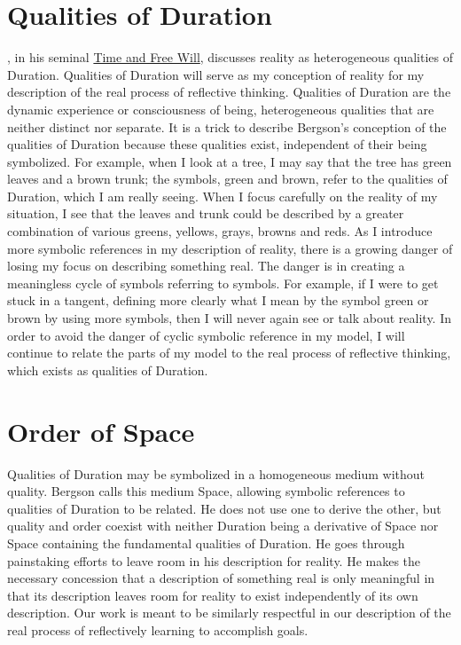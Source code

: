 \section{Qualities of Duration}

\cite{bergson:1910}, in his seminal \underline{Time and Free Will},
discusses reality as heterogeneous qualities of Duration.  Qualities
of Duration will serve as my conception of reality for my description
of the real process of reflective thinking.  Qualities of Duration are
the dynamic experience or consciousness of being, heterogeneous
qualities that are neither distinct nor separate.  It is a trick to
describe Bergson's conception of the qualities of Duration because
these qualities exist, independent of their being symbolized.  For
example, when I look at a tree, I may say that the tree has green
leaves and a brown trunk; the symbols, green and brown, refer to the
qualities of Duration, which I am really seeing.  When I focus
carefully on the reality of my situation, I see that the leaves and
trunk could be described by a greater combination of various greens,
yellows, grays, browns and reds.  As I introduce more symbolic
references in my description of reality, there is a growing danger of
losing my focus on describing something real.  The danger is in
creating a meaningless cycle of symbols referring to symbols.  For
example, if I were to get stuck in a tangent, defining more clearly
what I mean by the symbol green or brown by using more symbols, then I
will never again see or talk about reality.  In order to avoid the
danger of cyclic symbolic reference in my model, I will continue to
relate the parts of my model to the real process of reflective
thinking, which exists as qualities of Duration.

\section{Order of Space}

Qualities of Duration may be symbolized in a homogeneous medium
without quality.  Bergson calls this medium Space, allowing symbolic
references to qualities of Duration to be related.  He does not use
one to derive the other, but quality and order coexist with neither
Duration being a derivative of Space nor Space containing the
fundamental qualities of Duration.  He goes through painstaking
efforts to leave room in his description for reality.  He makes the
necessary concession that a description of something real is only
meaningful in that its description leaves room for reality to exist
independently of its own description.  Our work is meant to be
similarly respectful in our description of the real process of
reflectively learning to accomplish goals.

